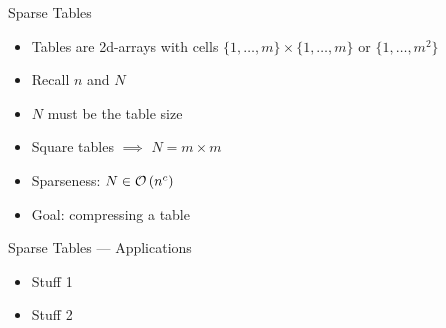 \begin{frame}{Sparse Tables}
	\begin{itemize}[<+->]
		\itemspacing{20pt}
		\item Tables are 2d-arrays with cells $\{1, \ldots, m\} \times \{1, \ldots, m\}$ or $\{ 1, \ldots, m^2 \}$
		\item Recall $n$ and $N$
		\item $N$ must be the table size
		\item Square tables $\implies$ $N = m \times m$
		\item Sparseness: $N \in \mathcal{O}\left(n^c\right)$
		\item Goal: compressing a table
	\end{itemize}
\end{frame}

\begin{frame}{Sparse Tables --- Applications}
	\begin{itemize}[<+->]
		\itemspacing{20pt}
		\item Stuff 1
		\item Stuff 2
	\end{itemize}
\end{frame}

